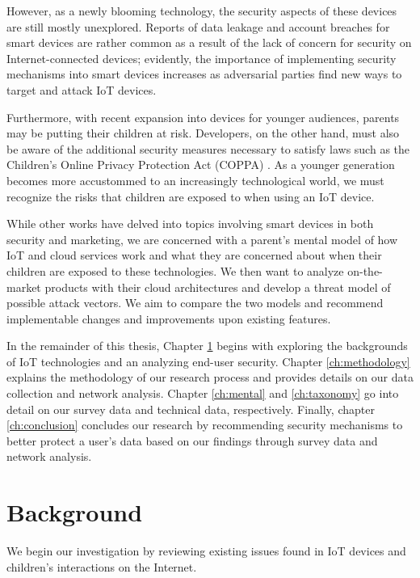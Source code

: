 \documentclass[12pt]{ucthesis}
\begin{document}
However, as a newly blooming technology, the security aspects of these devices are still mostly unexplored. Reports of data leakage and account breaches \cite{wp:camera} for smart devices are rather common as a result of the lack of concern for security on Internet-connected devices; evidently, the importance of implementing security mechanisms into smart devices increases as adversarial parties find new ways to target and attack IoT devices.

Furthermore, with recent expansion into devices for younger audiences, parents may be putting their children at risk. Developers, on the other hand, must also be aware of the additional security measures necessary to satisfy laws such as the Children's Online Privacy Protection Act (COPPA) \cite{reyes:coppa}. As a younger generation becomes more accustommed to an increasingly technological world, we must recognize the risks that children are exposed to when using an IoT device. 

While other works have delved into topics involving smart devices in both security and marketing, we are concerned with a parent's mental model of how IoT and cloud services work and what they are concerned about when their children are exposed to these technologies. We then want to analyze on-the-market products with their cloud architectures and develop a threat model of possible attack vectors. We aim to compare the two models and recommend implementable changes and improvements upon existing features.

In the remainder of this thesis, Chapter \ref{ch:background} begins with exploring the backgrounds of IoT technologies and an analyzing end-user security. Chapter \ref{ch:methodology} explains the methodology of our research process and provides details on our data collection and network analysis. Chapter \ref{ch:mental} and \ref{ch:taxonomy} go into detail on our survey data and technical data, respectively. Finally, chapter \ref{ch:conclusion} concludes our research by recommending security mechanisms to better protect a user's data based on our findings through survey data and network analysis.

\chapter{Background}
\label{ch:background}
We begin our investigation by reviewing existing issues found in IoT devices and children's interactions on the Internet.
\end{document}
